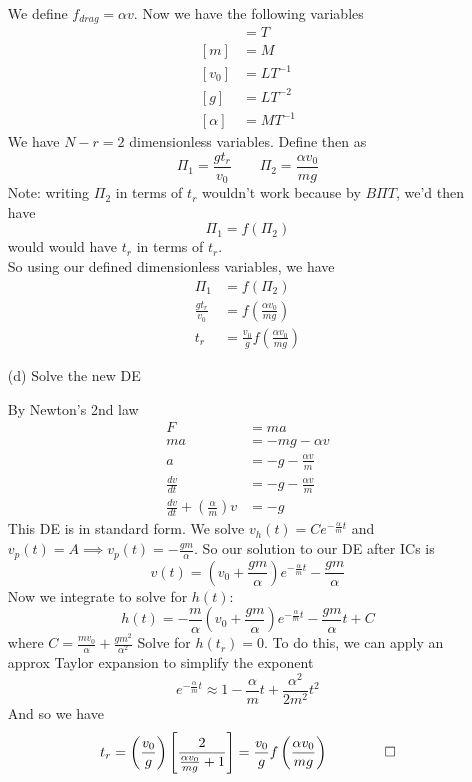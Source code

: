 \documentclass{report}
\begin{document}
\begin{enumerate}
\vspace{0.5em}\noindent
We define $f_{drag} = \alpha v$. Now we have the following variables
\begin{align*}
[t_r] &= T \\
[m] &= M \\
[v_0] &= LT^{-1} \\
[g] &= LT^{-2} \\
[\alpha] &= MT^{-1}
\end{align*}
We have $N-r = 2$ dimensionless variables. Define then as
$$\Pi_1 = \frac{gt_r}{v_0} \qquad \Pi_2 = \frac{\alpha v_0}{mg}$$
Note: writing $\Pi_2$ in terms of $t_r$ wouldn't work because by $B\Pi T$, we'd then have
$$\Pi_1 = f\left(\Pi_2\right)$$
would would have $t_r$ in terms of $t_r$. \\
So using our defined dimensionless variables, we have
\begin{align*}
\Pi_1 &= f(\Pi_2) \\
\frac{gt_r}{v_0} &= f\left(\frac{\alpha v_0}{mg}\right) \\
t_r &= \frac{v_0}{g}f\left(\frac{\alpha v_0}{mg}\right)
\end{align*}
\item[(d)] Solve the new DE

\vspace{0.5em}\noindent
By Newton's 2nd law
\begin{align*}
F &= ma \\
ma &= -mg -\alpha v \\
a &= -g - \frac{\alpha v}{m} \\
\frac{dv}{dt} &= -g - \frac{\alpha v}{m} \\
\frac{dv}{dt} + \left(\frac{\alpha}{m}\right)v &= -g
\end{align*}
This DE is in standard form. We solve $v_h(t) = Ce^{-\frac{\alpha}{m}t}$ and $v_p(t) = A \implies v_p(t) = -\frac{gm}{\alpha}$. So our solution to our DE after ICs is
$$v(t) = \left(v_0 + \frac{gm}{\alpha}\right)e^{-\frac{\alpha}{m}t} - \frac{gm}{\alpha}$$
Now we integrate to solve for $h(t)$:
$$h(t) = -\frac{m}{\alpha}\left(v_0 + \frac{gm}{\alpha}\right)e^{-\frac{\alpha}{m}t} - \frac{gm}{\alpha}t + C$$
where $C = \frac{mv_0}{\alpha} + \frac{gm^2}{\alpha^2}$
Solve for $h(t_r) = 0$. To do this, we can apply an approx Taylor expansion to simplify the exponent
$$e^{-\frac{\alpha}{m}t} \approx 1 - \frac{\alpha}{m}t + \frac{\alpha^2}{2m^2}t^2$$
And so we have
$$t_r = \left(\frac{v_0}{g}\right)\left[\frac{2}{\frac{\alpha v_0}{mg} + 1}\right] = \frac{v_0}{g}f\left(\frac{\alpha v_0}{mg}\right) \qquad \qed$$
\end{enumerate}
\end{document}
